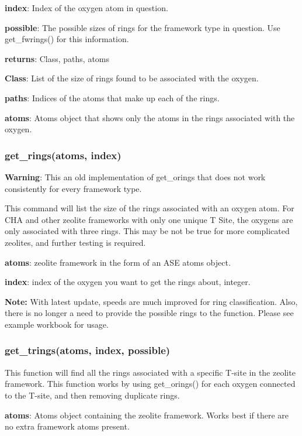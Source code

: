 \documentclass[11pt]{article}
\begin{document}
\textbf{index}: Index of the oxygen atom in question.

\textbf{possible}: The possible sizes of rings for the framework type in question. Use get\_fwrings() for this information.

\textbf{returns}: Class, paths, atoms

\textbf{Class}: List of the size of rings found to be associated with the oxygen.

\textbf{paths}: Indices of the atoms that make up each of the rings.

\textbf{atoms}: Atoms object that shows only the atoms in the rings associated with the oxygen.


\subsubsection{get\_rings(atoms, index)}
\label{sec:org834438b}

\textbf{Warning}: This an old implementation of get\_orings that does not work consistently for every framework type. 

This command will list the size of the rings associated with an oxygen atom. For CHA and other zeolite frameworks with only one unique T Site, the oxygens are only associated with three rings. This may be not be true for more complicated zeolites, and further testing is required.

\textbf{atoms}: zeolite framework in the form of an ASE atoms object.

\textbf{index}: index of the oxygen you want to get the rings about, integer.

\textbf{Note:} With latest update, speeds are much improved for ring classification. Also, there is no longer a need to provide the possible rings to the function. Please see example workbook for usage.


\subsubsection{get\_trings(atoms, index, possible)}
\label{sec:orgdfebb35}

This function will find all the rings associated with a specific T-site in the zeolite framework. This function works by using get\_orings() for each oxygen connected to the T-site, and then removing duplicate rings. 

\textbf{atoms}: Atoms object containing the zeolite framework. Works best if there are no extra framework atoms present.
\end{document}

